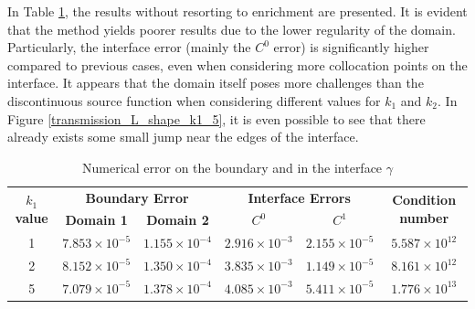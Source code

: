 In Table \ref{tab:transmission_results_L_shape_rectangles}, the results without resorting to enrichment are presented. It is evident that the method yields poorer results due to the lower regularity of the domain. Particularly, the interface error (mainly the \(C^0\) error) is significantly higher compared to previous cases, even when considering more collocation points on the interface. It appears that the domain itself poses more challenges than the discontinuous source function when considering different values for \(k_1\) and \(k_2\). In Figure \ref{transmission_L_shape_k1_5}, it is even possible to see that there already exists some small jump near the edges of the interface.

\begin{table}[!htbp]
    \centering
    \begin{tabular}{cccccc}
      \toprule
      \multirow{2}{*}{\textbf{\(k_1\) value}} & \multicolumn{2}{c}{\textbf{Boundary Error}} & \multicolumn{2}{c}{\textbf{Interface Errors}} & \multirow{2}{*}{\textbf{Condition number}} \\
      \cmidrule(lr){2-3} \cmidrule(lr){4-5}
      & \textbf{Domain 1} & \textbf{Domain 2} & \textbf{\(C^0\)} & \textbf{\(C^1\)} & \\
      \midrule
      1 & $7.853\times10^{-5}$ & $1.155\times10^{-4}$ & $2.916\times10^{-3}$ & $2.155\times10^{-5}$ & $5.587\times 10^{12}$ \\
      2 & $8.152\times10^{-5}$ & $1.350\times10^{-4}$ & $3.835\times10^{-3}$ & $1.149\times10^{-5}$ & $8.161\times 10^{12}$ \\
      5 & $7.079\times10^{-5}$ & $1.378\times10^{-4}$ & $4.085\times10^{-3}$ & $5.411\times10^{-5}$ & $1.776\times 10^{13}$ \\
      \bottomrule
    \end{tabular}
    \caption{Numerical error on the boundary and in the interface \(\gamma\)}
    \label{tab:transmission_results_L_shape_rectangles}
\end{table}


